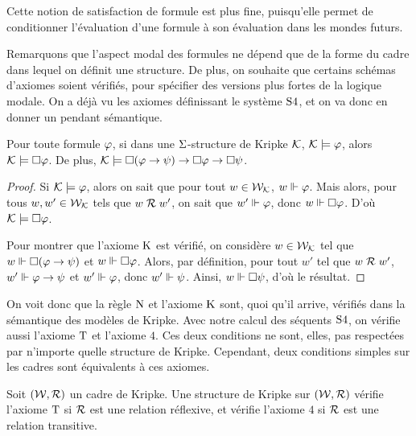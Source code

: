 Cette notion de satisfaction de formule est plus fine, puisqu'elle permet de
conditionner l'évaluation d'une formule à son évaluation dans les mondes
futurs.

Remarquons que l'aspect modal des formules ne dépend que de la forme du cadre
dans lequel on définit une structure. De plus, on souhaite que certains schémas
d'axiomes soient vérifiés, pour spécifier des versions plus fortes de la
logique modale. On a déjà vu les axiomes définissant le système $\mathrm{S}4$, et on
va donc en donner un pendant sémantique.

\begin{proposition}
  Pour toute formule $\varphi$, si dans une $\Sigma$-structure de Kripke
  $\mathcal{K}$, $\mathcal{K} \models \varphi$, alors $\mathcal{K} \models \mathbin{\square}\varphi$.
  De plus,
  $\mathcal{K} \models \mathbin{\square}(\varphi \to \psi) \to
  \mathbin{\square} \varphi \to \mathbin{\square}\psi$.
\end{proposition}

\begin{proof}
  Si $\mathcal{K} \models \varphi$, alors on sait que pour tout
  $w \in \mathcal{W}_{\mathcal{K}}$, $w\Vdash\varphi$. Mais alors, pour tous
  $w,w'\in \mathcal{W}_{\mathcal{K}}$ tels que $w\mathrel{\mathcal{R}} w'$, on sait que
  $w'\Vdash\varphi$,
  donc $w\Vdash\mathbin{\square}\varphi$. D'où $\mathcal{K} \models\mathbin{\square}\varphi$.

  Pour montrer que l'axiome $\operatorname{K}$ est vérifié, on considère
  $w \in \mathcal{W}_{\mathcal{K}}$ tel que $w\Vdash\mathbin{\square}(\varphi\to\psi)$ et
  $w\Vdash\mathbin{\square} \varphi$. Alors, par définition, pour tout $w'$ tel que
  $w\mathrel{\mathcal{R}} w'$, $w'\Vdash\varphi \to \psi$ et $w'\Vdash\varphi$, donc
  $w'\Vdash\psi$. Ainsi, $w\Vdash\mathbin{\square}\psi$, d'où le résultat.
\end{proof}

On voit donc que la règle $\operatorname{N}$ et l'axiome $\operatorname{K}$ sont, quoi qu'il arrive,
vérifiés dans la sémantique des modèles de Kripke. Avec notre calcul des
séquents $\mathrm{S}4$, on vérifie aussi l'axiome $\operatorname{T}$ et l'axiome $4$. Ces deux
conditions ne sont, elles, pas respectées par n'importe quelle structure de
Kripke. Cependant, deux conditions simples sur les cadres sont équivalents à ces
axiomes.

\begin{proposition}
  Soit $(\mathcal{W},\mathrel{\mathcal{R}})$ un cadre de Kripke. Une structure de Kripke sur
  $(\mathcal{W},\mathrel{\mathcal{R}})$ vérifie l'axiome $\operatorname{T}$ si $\mathrel{\mathcal{R}}$ est une relation
  réflexive, et vérifie l'axiome $4$ si $\mathrel{\mathcal{R}}$ est une relation transitive.
\end{proposition}

